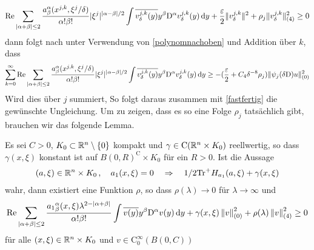 \begin{align}
\operatorname{Re}\sum_{|\alpha+\beta|\le 2} \frac{a^\alpha_\beta(x^{j,k},\xi^j/\delta)}{\alpha!\beta!}|\xi^j|^{|\alpha-\beta|/2}\int \overline{v^{j,k}_\delta(y)}y^\beta\mathrm D^\alpha v^{j,k}_\delta(y)\,\mathrm d y + \frac{\varepsilon}{2}\lVert v^{j,k}_\delta\rVert^2 + \rho_j \lVert v^{j,k}_\delta\rVert_{(4)}^2 \ge 0
\end{align}
dann folgt nach unter Verwendung von \eqref{polynomnachoben} und Addition über $k$,  dass 
\begin{align}
\sum_{k=0}^\infty \operatorname{Re}\sum_{|\alpha+\beta|\le 2} \frac{a^\alpha_\beta(x^{j,k},\xi^j/\delta)}{\alpha!\beta!}|\xi^j|^{|\alpha-\beta|/2}\int \overline{v^{j,k}_\delta(y)}y^\beta\mathrm D^\alpha v^{j,k}_\delta(y)\,\mathrm d y \ge -(\frac{\varepsilon}{2}+C_4\delta^{-8} \rho_j)\lVert\psi_j({\delta\mathrm D})u\rVert_{(0)}^2 
\end{align}
Wird dies über $j$ summiert, So folgt daraus zusammen mit \eqref{fastfertig} die gewünschte Ungleichung. Um zu zeigen, dass es so eine Folge $\rho_j$ tatsächlich gibt, brauchen wir das folgende Lemma.

\begin{lem}
Es sei $C>0$, $K_0\subset\mathbb R^n\setminus\{0\}$ kompakt und $\gamma\in\mathrm C(\mathbb R^n\times K_0)$ reellwertig, so dass $\gamma(x,\xi)$ konstant ist auf $B(0,R)^\mathrm{C}\times K_0$ für ein $R>0$. Ist die Aussage
\begin{align}\label{melinendlemma1}
(a,\xi)\in\mathbb R^n\times K_0\,,\quad a_1(x,\xi)=0 \quad \Rightarrow \quad 1/2 \mathrm{Tr}^+H_{a_1}(a,\xi) + \gamma(x,\xi)
\end{align}
wahr, dann existiert eine Funktion $\rho$, so dass $\rho(\lambda)\to 0$ für $\lambda\to\infty$ und
\begin{align}\label{melinendlemma2}
\operatorname{Re} \sum_{|\alpha+\beta|\le 2} \frac{{a_1}^\alpha_\beta(x,\xi)\lambda^{2-|\alpha+\beta|}}{\alpha!\beta!}\int\overline{v(y)}y^\beta\mathrm D^\alpha v(y)\,\mathrm d y + \gamma(x,\xi)\left\lVert v\right\rVert_{(0)}^2 + \rho(\lambda)\left\lVert v\right\rVert _{(4)}^2 \ge 0
\end{align}
für alle $(x,\xi)\in\mathbb R^n\times K_0$ und $v\in\mathrm C^\infty_0(B(0,C))$
\end{lem}


